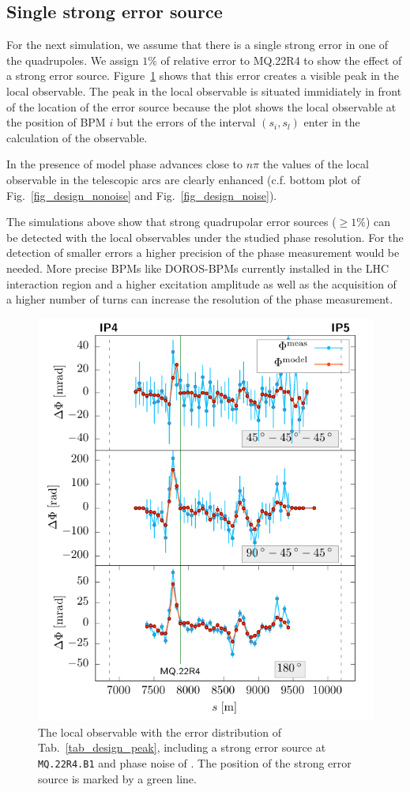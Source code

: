 \subsection{Single strong error source}

For the next simulation, we assume that there is a single strong error in one of the quadrupoles. We
assign $1\%$ of relative error to MQ.22R4 to show the effect of a strong error source. Figure~\ref{fig_peak_noise}
shows that this error creates a visible peak in the local observable.
The peak in the local observable is situated immidiately in front of the location of the error source
because the plot shows the local observable at the position of BPM $i$ but the errors of the interval
$(s_i, s_l)$ enter in the calculation of the observable.

In the presence of model phase advances close to $n\pi$ the values of the local observable in the
telescopic arcs are clearly enhanced (c.f. bottom plot of Fig.~\ref{fig_design_nonoise} and
Fig.~\ref{fig_design_noise}).

The simulations above show that strong quadrupolar error sources ($\geq 1\%$) can be detected with the local
observables under the studied phase resolution.
For the detection of smaller errors a higher precision of the phase measurement would be needed.
More precise BPMs like DOROS-BPMs \cite{Gasior2011} currently installed in the LHC interaction region and a higher excitation
amplitude as well as the acquisition of a higher number of turns
can increase the resolution of the phase measurement. 
%
\begin{figure}
  \centering
\includegraphics[width=.8\linewidth]{sim_peak}
\caption{The local observable with the error distribution of Tab.~\ref{tab_design_peak}, including
    a strong error source at \texttt{MQ.22R4.B1} and phase
    noise of \noiserms.
    The position of the strong error source is marked by a green line.
  }
  \label{fig_peak_noise}
\end{figure}
%
